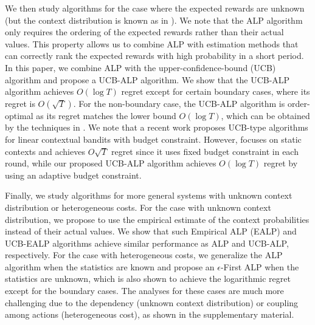 We then study algorithms for the case where the expected rewards are unknown (but the context distribution is known as in \cite{Badanidiyuru2014COLT}).
We note that the ALP algorithm only requires the ordering of the expected rewards rather than their actual values.
This property allows us to combine  ALP with estimation methods that can correctly rank the expected rewards with high probability in a short period. In this paper, we combine ALP with
the upper-confidence-bound (UCB) algorithm \cite{Auer2002ML:UCB} and propose a UCB-ALP algorithm.
We show that  the UCB-ALP algorithm achieves $O(\log T)$ regret except for certain boundary cases, where its regret is $O(\sqrt{T})$.
For the non-boundary case, the UCB-ALP algorithm is order-optimal as its regret matches the lower bound $O(\log T)$, which can be obtained by the techniques in \cite{Lai1985AAM}. We note that a recent work \cite{Agrawal2014EC} proposes UCB-type algorithms  for linear contextual bandits with budget constraint. However, \cite{Agrawal2014EC} focuses on static contexts and achieves $O{\sqrt{T}}$ regret since it uses fixed budget constraint in each round, while our proposed UCB-ALP algorithm achieves $O(\log T)$ regret by using an adaptive budget constraint.


Finally, we study algorithms for more general systems with unknown context distribution or heterogeneous costs. For the case with unknown context distribution, we propose to use the empirical estimate of the context probabilities instead of their actual values. We show that such Empirical ALP (EALP) and UCB-EALP algorithms achieve similar performance as ALP and UCB-ALP, respectively. For the case with heterogeneous costs, we generalize the ALP algorithm when the statistics are known and  propose an $\epsilon$-First ALP when the statistics are unknown, which is also shown to achieve the logarithmic regret except for the boundary cases. The analyses for these cases are much more challenging due to the dependency (unknown context distribution) or coupling among actions (heterogeneous cost), as shown in the supplementary material.

